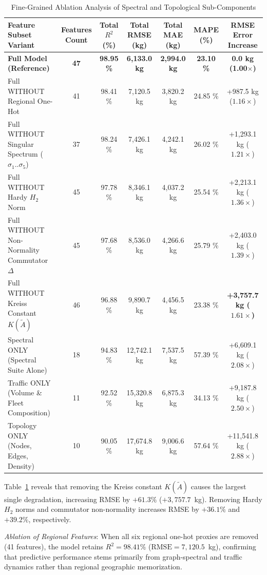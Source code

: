 \documentclass[journal]{IEEEtran}
\begin{document}
\begin{table}[htbp]
\caption{Fine-Grained Ablation Analysis of Spectral and Topological Sub-Components}
\label{tab:fine_ablation}
\centering
\begin{tabular}{lcccccc}
\toprule
Feature Subset Variant & Features Count & Total $R^2$ (\%) & Total RMSE (kg) & Total MAE (kg) & MAPE (\%) & RMSE Error Increase \\
\midrule
\textbf{Full Model (Reference)} & \textbf{47} & \textbf{98.95 \%} & \textbf{6,133.0 kg} & \textbf{2,994.0 kg} & \textbf{23.10 \%} & \textbf{0.0 kg (1.00$\times$)} \\
Full WITHOUT Regional One-Hot & 41 & 98.41 \% & 7,120.5 kg & 3,820.2 kg & 24.85 \% & +987.5 kg ($1.16\times$) \\
Full WITHOUT Singular Spectrum ($\sigma_1..\sigma_5$) & 37 & 98.24 \% & 7,426.1 kg & 4,242.1 kg & 26.02 \% & +1,293.1 kg ($1.21\times$) \\
Full WITHOUT Hardy $H_2$ Norm & 45 & 97.78 \% & 8,346.1 kg & 4,037.2 kg & 25.54 \% & +2,213.1 kg ($1.36\times$) \\
Full WITHOUT Non-Normality Commutator $\Delta$ & 45 & 97.68 \% & 8,536.0 kg & 4,266.6 kg & 25.79 \% & +2,403.0 kg ($1.39\times$) \\
Full WITHOUT Kreiss Constant $K(\tilde{A})$ & 46 & 96.88 \% & 9,890.7 kg & 4,456.5 kg & 23.38 \% & \textbf{+3,757.7 kg ($1.61\times$)} \\
\midrule
Spectral ONLY (Spectral Suite Alone) & 18 & 94.83 \% & 12,742.1 kg & 7,537.5 kg & 57.39 \% & +6,609.1 kg ($2.08\times$) \\
Traffic ONLY (Volume \& Fleet Composition) & 11 & 92.52 \% & 15,320.8 kg & 6,875.3 kg & 34.13 \% & +9,187.8 kg ($2.50\times$) \\
Topology ONLY (Nodes, Edges, Density) & 10 & 90.05 \% & 17,674.8 kg & 9,006.6 kg & 57.64 \% & +11,541.8 kg ($2.88\times$) \\
\bottomrule
\end{tabular}
\end{table}

Table~\ref{tab:fine_ablation} reveals that removing the Kreiss constant $K(\tilde{A})$ causes the largest single degradation, increasing RMSE by $+61.3\%$ ($+3,757.7$~kg). Removing Hardy $H_2$ norms and commutator non-normality increases RMSE by $+36.1\%$ and $+39.2\%$, respectively. 

\textit{Ablation of Regional Features}: When all six regional one-hot proxies are removed (41 features), the model retains $R^2 = 98.41\%$ ($\text{RMSE} = 7,120.5$~kg), confirming that predictive performance stems primarily from graph-spectral and traffic dynamics rather than regional geographic memorization.
\end{document}
